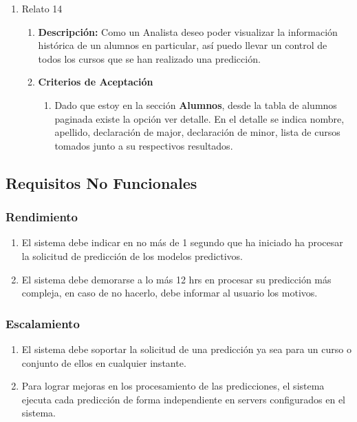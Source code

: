 \begin{enumerate}
\begin{enumerate}
\begin{enumerate}
				\end{enumerate}
		\end{enumerate}
	\item Relato 14
		\begin{enumerate}
			\item \textbf{Descripción:} Como un Analista deseo poder visualizar la información histórica de un alumnos en particular, así puedo llevar un control de todos los cursos que se han realizado una predicción.
			\item \textbf{Criterios de Aceptación}
				\begin{enumerate}
					\item Dado que estoy en la sección \textbf{Alumnos}, desde la tabla de alumnos paginada existe la opción ver detalle. En el detalle se indica nombre, apellido, declaración de major, declaración de minor, lista de cursos tomados junto a su respectivos resultados.
				\end{enumerate}
		\end{enumerate}
\end{enumerate}


\subsection{Requisitos No Funcionales \label{sec:user_description}}

\subsubsection{Rendimiento \label{sec:performance}}

	\begin{enumerate}
		\item El sistema debe indicar en no más de 1 segundo que ha iniciado ha procesar la solicitud de predicción de los modelos predictivos.
		\item El sistema debe demorarse a lo más 12 hrs en procesar su predicción más compleja, en caso de no hacerlo, debe informar al usuario los motivos.
	\end{enumerate}

\subsubsection{Escalamiento \label{sec:scalability}}

	\begin{enumerate}
		\item El sistema debe soportar la solicitud de una predicción ya sea para un curso o conjunto de ellos en cualquier instante.
		\item Para lograr mejoras en los procesamiento de las predicciones, el sistema ejecuta cada predicción de forma independiente en servers configurados en el sistema.
	\end{enumerate}

